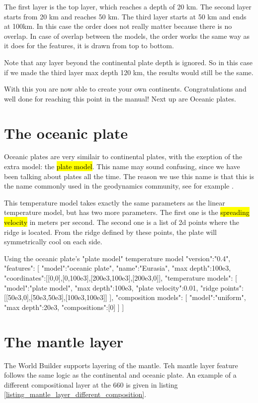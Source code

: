 \documentclass{book}
\newcommand{\WB}{{World Builder}}
\begin{document}
The first layer is the top layer, which reaches a depth of 20 km. The second layer starts from 20 km and reaches 50 km. The third layer starts at 50 km and ends at 100km. In this case the order does not really matter because there is no overlap. In case of overlap between the models, the order works the same way as it does for the features, it is drawn from top to bottom.

\begin{remark}
Note that any layer beyond the continental plate depth is ignored. So in this case if we made the third layer max depth 120 km, the results would still be the same.
\end{remark}

With this you are now able to create your own continents. Congratulations and well done for reaching this point in the manual! Next up are Oceanic plates.

\section{The oceanic plate}
Oceanic plates are very similair to continental plates, with the exeption of the extra model: the \hl{plate model}. This name may sound confusing, since we have been talking about plates all the time. The reason we use this name is that this is the name commonly used in the geodynamics community, see for example \cite{fowler2005}. 

This temperature model takes exactly the same parameters as the linear temperature model, but has two more parameters. The first one is the \hl{spreading velocity} in meters per second. The second one is a list of 2d points where the ridge is located. From the ridge defined by these points, the plate will symmetrically cool on each side.

\begin{javascriptcode}{Using the oceanic plate's "plate model" temperature model}{}
{
  "version":"0.4",
  "features":
  [
    {
      "model":"oceanic plate", "name":"Eurasia", "max depth":100e3,
      "coordinates":[[0,0],[0,100e3],[200e3,100e3],[200e3,0]],
      "temperature models":
      [
        {
          "model":"plate model", "max depth":100e3, "plate velocity":0.01,
          "ridge points":[[50e3,0],[50e3,50e3],[100e3,100e3]]
        }
      ],
      "composition models":
      [
        {"model":"uniform", "max depth":20e3, "compositions":[0]}
      ]
    }
  ]
}
\end{javascriptcode}

\section{The mantle layer}
The \WB{} supports layering of the mantle. Teh mantle layer feature follows the same logic as the continental and oceanic plate. An example of a different compositional layer at the 660 is given in listing \ref{listing_mantle_layer_different_composition}.
\end{document}
